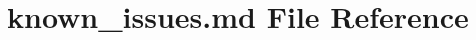 \hypertarget{known__issues_8md}{\section{known\-\_\-issues.\-md File Reference}
\label{known__issues_8md}
}
